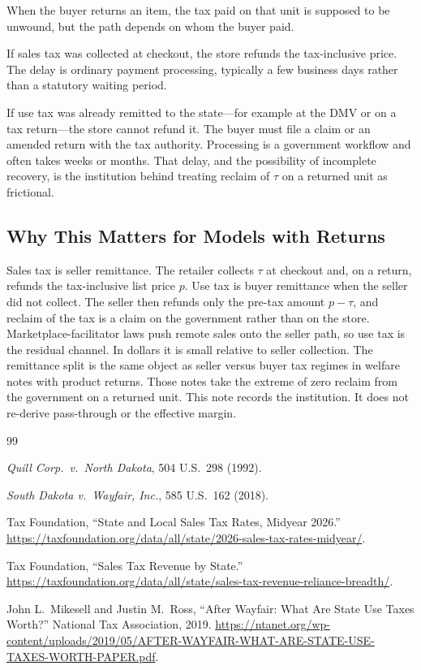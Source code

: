\documentclass[11pt]{article}
\begin{document}
When the buyer returns an item, the tax paid on that unit is supposed to be
unwound, but the path depends on whom the buyer paid.

If sales tax was collected at checkout, the store refunds the tax-inclusive
price.  The delay is ordinary payment processing, typically a few business
days rather than a statutory waiting period.

If use tax was already remitted to the state---for example at the DMV or on a
tax return---the store cannot refund it.  The buyer must file a claim or an
amended return with the tax authority.  Processing is a government workflow
and often takes weeks or months.  That delay, and the possibility of
incomplete recovery, is the institution behind treating reclaim of $\tau$ on a
returned unit as frictional.

\subsection{Why This Matters for Models with Returns}

Sales tax is seller remittance.  The retailer collects $\tau$ at checkout and,
on a return, refunds the tax-inclusive list price $p$.  Use tax is buyer
remittance when the seller did not collect.  The seller then refunds only the
pre-tax amount $p-\tau$, and reclaim of the tax is a claim on the government
rather than on the store.  Marketplace-facilitator laws push remote sales onto
the seller path, so use tax is the residual channel.  In dollars it is small
relative to seller collection.  The remittance split is the same object as
seller versus buyer tax regimes in welfare notes with product returns.  Those
notes take the extreme of zero reclaim from the government on a returned unit.
This note records the institution.  It does not re-derive pass-through or the
effective margin.

\begin{thebibliography}{99}

\emph{Quill Corp.\ v.\ North Dakota}, 504 U.S.\ 298 (1992).

\emph{South Dakota v.\ Wayfair, Inc.}, 585 U.S.\ 162 (2018).

Tax Foundation, ``State and Local Sales Tax Rates, Midyear 2026.''
\url{https://taxfoundation.org/data/all/state/2026-sales-tax-rates-midyear/}.

Tax Foundation, ``Sales Tax Revenue by State.''
\url{https://taxfoundation.org/data/all/state/sales-tax-revenue-reliance-breadth/}.

John L.\ Mikesell and Justin M.\ Ross, ``After Wayfair: What Are State Use Taxes
Worth?'' National Tax Association, 2019.
\url{https://ntanet.org/wp-content/uploads/2019/05/AFTER-WAYFAIR-WHAT-ARE-STATE-USE-TAXES-WORTH-PAPER.pdf}.

\end{thebibliography}
\end{document}
